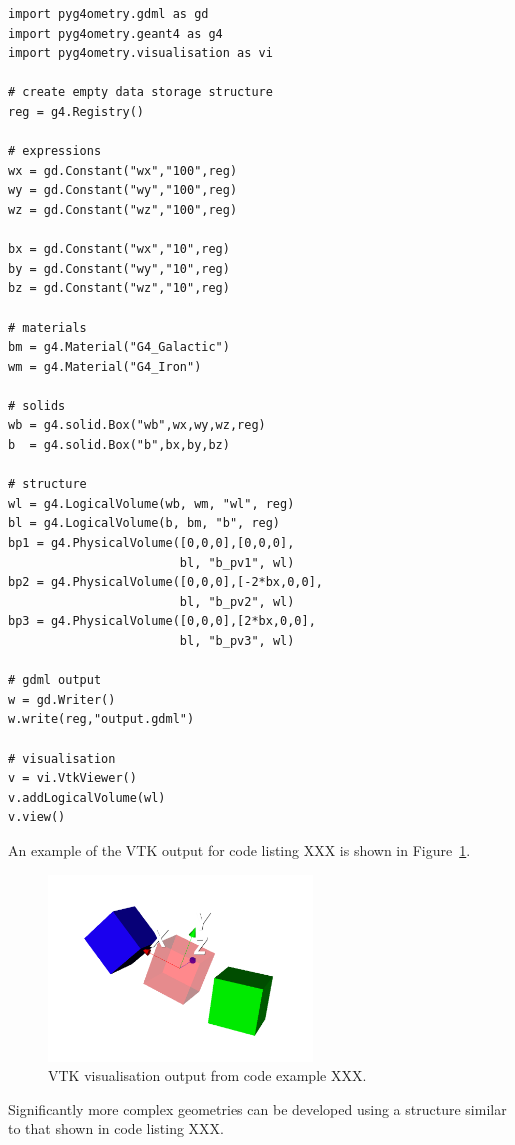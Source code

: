 \documentclass[final,5p,times,twocolumn]{elsarticle}
\begin{document}
{\small
\begin{verbatim}
import pyg4ometry.gdml as gd
import pyg4ometry.geant4 as g4
import pyg4ometry.visualisation as vi

# create empty data storage structure
reg = g4.Registry()

# expressions 
wx = gd.Constant("wx","100",reg)
wy = gd.Constant("wy","100",reg)
wz = gd.Constant("wz","100",reg)

bx = gd.Constant("wx","10",reg)
by = gd.Constant("wy","10",reg)
bz = gd.Constant("wz","10",reg)

# materials
bm = g4.Material("G4_Galactic") 
wm = g4.Material("G4_Iron") 

# solids
wb = g4.solid.Box("wb",wx,wy,wz,reg)
b  = g4.solid.Box("b",bx,by,bz)

# structure 
wl = g4.LogicalVolume(wb, wm, "wl", reg)
bl = g4.LogicalVolume(b, bm, "b", reg)
bp1 = g4.PhysicalVolume([0,0,0],[0,0,0], 
                        bl, "b_pv1", wl) 
bp2 = g4.PhysicalVolume([0,0,0],[-2*bx,0,0], 
                        bl, "b_pv2", wl)  
bp3 = g4.PhysicalVolume([0,0,0],[2*bx,0,0], 
                        bl, "b_pv3", wl) 
                        
# gdml output
w = gd.Writer()
w.write(reg,"output.gdml")

# visualisation 
v = vi.VtkViewer()
v.addLogicalVolume(wl)
v.view()
\end{verbatim}
}

An example of the VTK output for code listing XXX is shown in Figure~\ref{fig:rapidModellingExample}.
\begin{figure}[htbp]
\begin{center}
\includegraphics[width=7cm]{./diagrams/rapidModelling.pdf}
\caption{VTK visualisation output from code example XXX.}
\label{fig:rapidModellingExample}
\end{center}
\end{figure}
Significantly more complex geometries can be developed using a structure similar to that shown in code listing XXX.  
\end{document}
